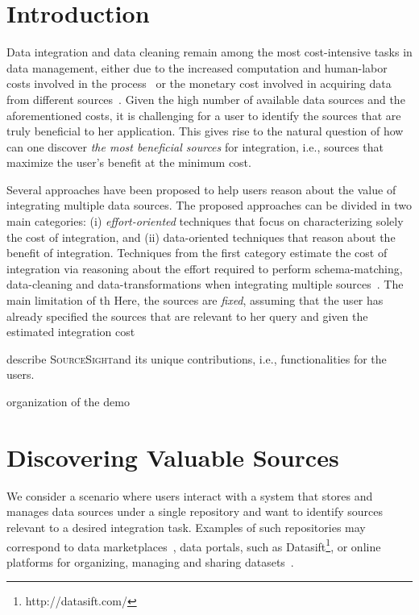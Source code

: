 \documentclass{vldb}
\newcommand\system{\textsc{SourceSight}}
\begin{document}
\section{Introduction}
Data integration and data cleaning remain among the most cost-intensive tasks in data management, either due to the increased computation and human-labor costs involved in the process~\cite{kruse2015estimating} or the monetary cost involved in acquiring data from different sources~\cite{balazinska:vldb11}. Given the high number of available data sources and the aforementioned costs, it is challenging for a user to identify the sources that are truly beneficial to her application. This gives rise to the natural question of how can one discover {\em the most beneficial sources} for integration, i.e., sources that maximize the user's benefit at the minimum cost. 

Several approaches have been proposed to help users reason about the value of integrating multiple data sources. The proposed approaches can be divided in two main categories: (i) {\em effort-oriented} techniques that focus on characterizing solely the cost of integration, and (ii) data-oriented techniques that reason about the benefit of integration. Techniques from the first category estimate the cost of integration via reasoning about the effort required to perform schema-matching, data-cleaning and data-transformations when integrating multiple sources~\cite{kruse2015estimating, smith:2009}. The main limitation of th Here, the sources are {\em fixed}, assuming that the user has already specified the sources that are relevant to her query and given the estimated integration cost 

describe \system and its unique contributions, i.e., functionalities for the users.

organization of the demo


\newpage
\section{Discovering Valuable Sources}
\label{sec:sources}
We consider a scenario where users interact with a system that stores and manages data sources under a single repository and want to identify sources relevant to a desired integration task. Examples of such repositories may correspond to data marketplaces~\cite{balazinska:vldb11}, data portals, such as Datasift\footnote{http://datasift.com/}, or online platforms for organizing, managing and sharing datasets~\cite{datahub}. 
\end{document}
